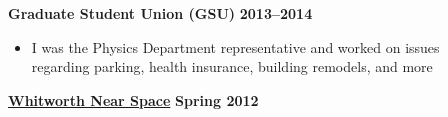 \documentclass[margin]{res}
\begin{document}
\begin{resume}
{\bf Graduate Student Union (GSU)} \hfill {\bf 2013--2014}
    \begin{itemize}\itemsep -2pt
    \item[] I was the Physics Department representative and worked on issues \\regarding parking, health insurance, building remodels, and more
    \end{itemize} \vspace{-12pt}
{\bf\href{http://www.whitworthnearspace.org/wiki/Main_Page}{Whitworth Near Space}} \hfill  \textbf{Spring 2012} 
    \begin{itemize}\itemsep -2pt

\end{itemize}
\end{resume}
\end{document}
